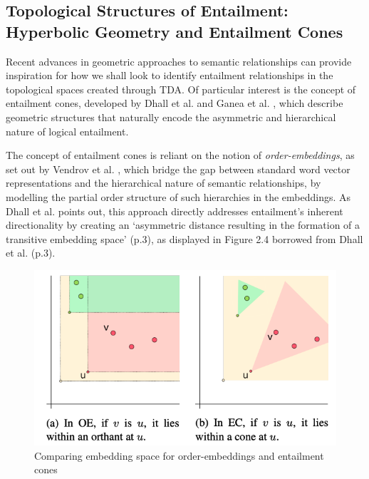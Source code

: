 \documentclass[12pt,twoside]{report}
\begin{document}
\subsection{Topological Structures of Entailment: Hyperbolic Geometry and Entailment Cones}
Recent advances in geometric approaches to semantic relationships can provide inspiration for how we shall look to identify entailment relationships in the topological spaces created through TDA. Of particular interest is the concept of entailment cones, developed by Dhall et al. \cite{dhall2020hierarchicalimageclassificationusing} and Ganea et al. \cite{ganea2018hyperbolicentailmentconeslearning}, which describe geometric structures that naturally encode the asymmetric and hierarchical nature of logical entailment. \newline \par

The concept of entailment cones is reliant on the notion of \textit{order-embeddings}, as set out by Vendrov et al. \cite{vendrov2016orderembeddingsimageslanguage}, which bridge the gap between standard word vector representations and the hierarchical nature of semantic relationships, by modelling the partial order structure of such hierarchies in the embeddings. As Dhall et al. \cite{dhall2020hierarchicalimageclassificationusing} points out, this approach directly addresses entailment's inherent directionality by creating an `asymmetric distance resulting in the formation of a transitive embedding space' (p.3), as displayed in Figure 2.4 borrowed from Dhall et al. (p.3).  

\begin{figure}[H]
\centering
\includegraphics[height = 0.2\textheight]{./figures/OEandEC.png}
\caption{Comparing embedding space for order-embeddings and entailment cones}
\label{fig:OE+EC}
\end{figure}
\end{document}
